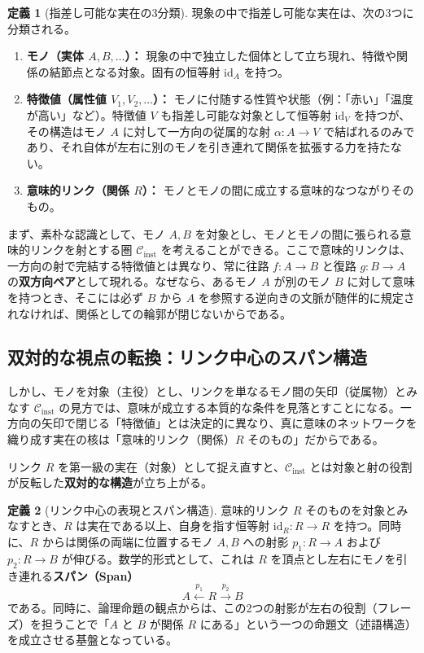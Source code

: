 \documentclass[11pt,a4paper,luatex]{jlreq}
\theoremstyle{definition}
\newtheorem{definition}{定義}[section]
\theoremstyle{plain}
\begin{document}
\begin{definition}[指差し可能な実在の3分類]
現象の中で指差し可能な実在は、次の3つに分類される。
\begin{enumerate}
    \item \textbf{モノ（実体 $A, B, \dots$）：} 現象の中で独立した個体として立ち現れ、特徴や関係の結節点となる対象。固有の恒等射 $\mathrm{id}_{A}$ を持つ。
    \item \textbf{特徴値（属性値 $V_1, V_2, \dots$）：} モノに付随する性質や状態（例：「赤い」「温度が高い」など）。特徴値 $V$ も指差し可能な対象として恒等射 $\mathrm{id}_{V}$ を持つが、その構造はモノ $A$ に対して一方向の従属的な射 $\alpha: A \to V$ で結ばれるのみであり、それ自体が左右に別のモノを引き連れて関係を拡張する力を持たない。
    \item \textbf{意味的リンク（関係 $R$）：} モノとモノの間に成立する意味的なつながりそのもの。
\end{enumerate}
\end{definition}

まず、素朴な認識として、モノ $A, B$ を対象とし、モノとモノの間に張られる意味的リンクを射とする圏 $\mathcal{C}_{\mathrm{inst}}$ を考えることができる。ここで意味的リンクは、一方向の射で完結する特徴値とは異なり、常に往路 $f: A \to B$ と復路 $g: B \to A$ の\textbf{双方向ペア}として現れる。なぜなら、あるモノ $A$ が別のモノ $B$ に対して意味を持つとき、そこには必ず $B$ から $A$ を参照する逆向きの文脈が随伴的に規定されなければ、関係としての輪郭が閉じないからである。

\subsection{双対的な視点の転換：リンク中心のスパン構造}

しかし、モノを対象（主役）とし、リンクを単なるモノ間の矢印（従属物）とみなす $\mathcal{C}_{\mathrm{inst}}$ の見方では、意味が成立する本質的な条件を見落とすことになる。一方向の矢印で閉じる「特徴値」とは決定的に異なり、真に意味のネットワークを織り成す実在の核は「意味的リンク（関係）$R$ そのもの」だからである。

リンク $R$ を第一級の実在（対象）として捉え直すと、$\mathcal{C}_{\mathrm{inst}}$ とは対象と射の役割が反転した\textbf{双対的な構造}が立ち上がる。

\begin{definition}[リンク中心の表現とスパン構造]
意味的リンク $R$ そのものを対象とみなすとき、$R$ は実在である以上、自身を指す恒等射 $\mathrm{id}_R: R \to R$ を持つ。同時に、$R$ からは関係の両端に位置するモノ $A, B$ への射影 $p_1: R \to A$ および $p_2: R \to B$ が伸びる。数学的形式として、これは $R$ を頂点とし左右にモノを引き連れる\textbf{スパン（Span）} \cite{benabou1967}
\begin{equation*}
A \xleftarrow{p_1} R \xrightarrow{p_2} B
\end{equation*}
である。同時に、論理命題の観点からは、この2つの射影が左右の役割（フレーズ）を担うことで「$A$ と $B$ が関係 $R$ にある」という一つの命題文（述語構造）を成立させる基盤となっている。
\end{definition}
\end{document}
